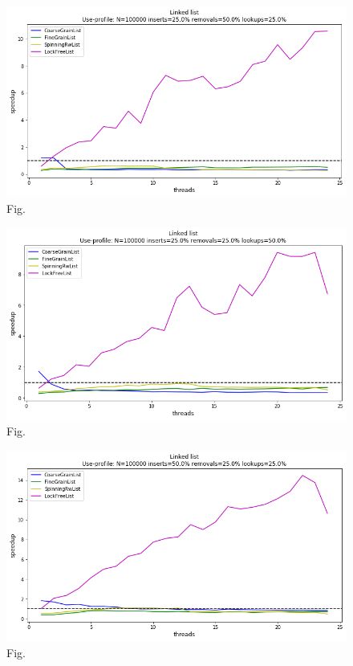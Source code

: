 \documentclass[11pt]{article}
\begin{document}
\begin{figure}[h]
\centering
\includegraphics[width=1.0\linewidth]{figs/lateday/combined/lateday_combined_list_insert_25_lookup_25_removal_50}
\caption{Fig.}
\label{fig:fig1}
\end{figure}

\begin{figure}[h]
\centering
\includegraphics[width=1.0\linewidth]{figs/lateday/combined/lateday_combined_list_insert_25_lookup_50_removal_25}
\caption{Fig.}
\label{fig:fig1}
\end{figure}

\begin{figure}[h]
\centering
\includegraphics[width=1.0\linewidth]{figs/lateday/combined/lateday_combined_list_insert_50_lookup_25_removal_25}
\caption{Fig.}
\label{fig:fig1}
\end{figure}
\end{document}
